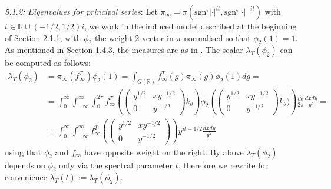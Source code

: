 \documentclass{article}
\numberwithin{equation}{section}
\begin{document}
\noindent \emph{5.1.2: Eigenvalues for principal series}:
Let $\pi_\infty = \pi(\text{sgn}^\epsilon |\cdot |^{it},\text{sgn}^\epsilon |\cdot |^{-it})$ with $t \in \mathbb{R\cup} (-1/2,1/2)i$, we work in the induced model described at the beginning of Section 2.1.1, with $\phi_2$ the weight $2$ vector in $\pi$ normalised so that $\phi_2(1)=1$. As mentioned in Section 1.4.3, the measures are as in \cite[\S 7]{Traces}. The scalar $\lambda_T(\phi_2)$ can be computed as follows:
\begin{equation}\label{eq:expression-lambda-T-principal}
    \begin{split}
        \lambda_{T} (\phi_2)& = \pi_\infty(f_\infty^T)\phi_2(1)=\int_{G(\mathbb{R})}f_\infty^T(g)\pi_\infty(g)\phi_2(1)dg =\\
        & =\int_{0}^\infty \int_{-\infty}^{\infty}\int_0^{2\pi}f_\infty^T\left(\begin{pmatrix}
            y^{1/2} & xy^{-1/2} \\ 0 & y^{-1/2}
        \end{pmatrix}k_\theta\right)\phi_2\left(\begin{pmatrix}
            y^{1/2} & xy^{-1/2} \\ 0 & y^{-1/2}
        \end{pmatrix}k_\theta)\right )\frac{d\theta}{2\pi}\frac{dxdy}{y^2}=\\
        & =\int_{0}^\infty \int_{-\infty}^{\infty}f_\infty^T\left(\begin{pmatrix}
            y^{1/2} & xy^{-1/2} \\ 0 & y^{-1/2}
        \end{pmatrix} \right)y^{it+1/2}\frac{dxdy}{y^2}
    \end{split}
\end{equation}
using that $\phi_2$ and $f_\infty$ have opposite weight on the right.
By above $\lambda_T(\phi_2)$ depends on $\phi_2$ only via the spectral parameter $t$, therefore we rewrite for convenience $\lambda_{T}(t):=\lambda_T(\phi_2)$.
\end{document}
